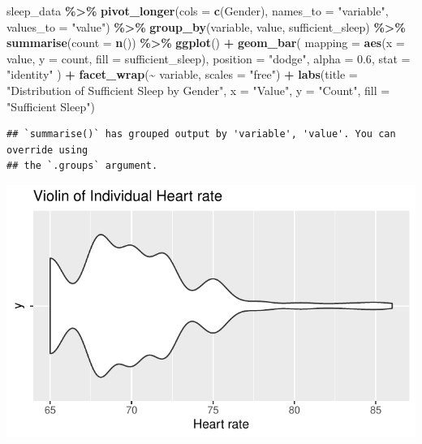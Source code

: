 \documentclass[
  11pt,
]{article}
\newenvironment{Shaded}{\begin{snugshade}}{\end{snugshade}}
\newcommand{\AttributeTok}[1]{\textcolor[rgb]{0.13,0.29,0.53}{#1}}
\newcommand{\FloatTok}[1]{\textcolor[rgb]{0.00,0.00,0.81}{#1}}
\newcommand{\FunctionTok}[1]{\textcolor[rgb]{0.13,0.29,0.53}{\textbf{#1}}}
\newcommand{\NormalTok}[1]{#1}
\newcommand{\SpecialCharTok}[1]{\textcolor[rgb]{0.81,0.36,0.00}{\textbf{#1}}}
\newcommand{\StringTok}[1]{\textcolor[rgb]{0.31,0.60,0.02}{#1}}
\begin{document}
\begin{Shaded}
\begin{Highlighting}[]
\NormalTok{sleep\_data }\SpecialCharTok{\%\textgreater{}\%}
  \FunctionTok{pivot\_longer}\NormalTok{(}\AttributeTok{cols =} \FunctionTok{c}\NormalTok{(Gender), }\AttributeTok{names\_to =} \StringTok{"variable"}\NormalTok{, }\AttributeTok{values\_to =} \StringTok{"value"}\NormalTok{) }\SpecialCharTok{\%\textgreater{}\%}
  \FunctionTok{group\_by}\NormalTok{(variable, value, sufficient\_sleep) }\SpecialCharTok{\%\textgreater{}\%}
  \FunctionTok{summarise}\NormalTok{(}\AttributeTok{count =} \FunctionTok{n}\NormalTok{()) }\SpecialCharTok{\%\textgreater{}\%}
  \FunctionTok{ggplot}\NormalTok{() }\SpecialCharTok{+}
  \FunctionTok{geom\_bar}\NormalTok{(}
    \AttributeTok{mapping =} \FunctionTok{aes}\NormalTok{(}\AttributeTok{x =}\NormalTok{ value, }\AttributeTok{y =}\NormalTok{ count, }\AttributeTok{fill =}\NormalTok{ sufficient\_sleep),}
    \AttributeTok{position =} \StringTok{"dodge"}\NormalTok{,  }
    \AttributeTok{alpha =} \FloatTok{0.6}\NormalTok{,}
    \AttributeTok{stat =} \StringTok{"identity"}
\NormalTok{  ) }\SpecialCharTok{+}
  \FunctionTok{facet\_wrap}\NormalTok{(}\SpecialCharTok{\textasciitilde{}}\NormalTok{ variable, }\AttributeTok{scales =} \StringTok{"free"}\NormalTok{) }\SpecialCharTok{+}
  \FunctionTok{labs}\NormalTok{(}\AttributeTok{title =} \StringTok{"Distribution of Sufficient Sleep by Gender"}\NormalTok{,}
       \AttributeTok{x =} \StringTok{"Value"}\NormalTok{, }
       \AttributeTok{y =} \StringTok{"Count"}\NormalTok{, }
       \AttributeTok{fill =} \StringTok{"Sufficient Sleep"}\NormalTok{)}
\end{Highlighting}
\end{Shaded}

\begin{verbatim}
## `summarise()` has grouped output by 'variable', 'value'. You can override using
## the `.groups` argument.
\end{verbatim}

\begin{center}\includegraphics[width=0.7\linewidth]{SleepHelath_files/figure-latex/unnamed-chunk-40-1} \end{center}
\end{document}
